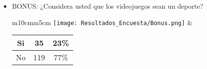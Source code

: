 \begin{itemize}
\begin{tabular}{m{10cm}m{5cm}}
      \end{tabular}
  \item BONUS: ¿Considera usted que los videojuegos sean un deporte? \\
      \begin{tabular}{m{10cm}m{5cm}}
        \texttt{[image: Resultados\_Encuesta/Bonus.png]} &
        \begin{tabular}{|c|cc|}
        \hline
         Si & 35 & 23\% \\ \hline
         No & 119 & 77\% \\ \hline
        \end{tabular} \\
      \end{tabular}
\end{itemize}
